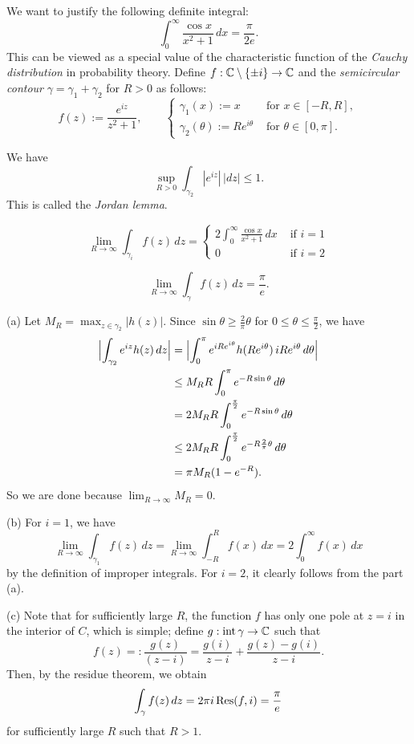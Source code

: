 \documentclass{../../large}
\begin{document}
\begin{prb}
We want to justify the following definite integral:
\[\int_0^\infty\frac{\cos x}{x^2+1}\,dx=\frac\pi{2e}.\]
This can be viewed as a special value of the characteristic function of the \emph{Cauchy distribution} in probability theory.
Define $f:\mathbb{C}\setminus\{\pm i\}\to\mathbb{C}$ and the \emph{semicircular contour} $\gamma=\gamma_1+\gamma_2$ for $R>0$ as follows:
\[f(z):=\frac{e^{iz}}{z^2+1},\qquad
\begin{cases}
\gamma_1(x):=x&\text{ for }x\in[-R,R],\\
\gamma_2(\theta):=Re^{i\theta}&\text{ for }\theta\in[0,\pi].
\end{cases}\]
\begin{parts}
\item We have
\[\sup_{R>0}\int_{\gamma_2}|e^{iz}|\,|dz|\le1.\]
This is called the \emph{Jordan lemma}.
\item
\[\lim_{R\to\infty}\int_{\gamma_i}f(z)\,dz=\begin{cases}
2\int_0^\infty\frac{\cos x}{x^2+1}\,dx&\text{ if }i=1\\
0&\text{ if }i=2
\end{cases}\]
\item
\[\lim_{R\to\infty}\int_\gamma f(z)\,dz=\frac\pi e.\]
\end{parts}
\end{prb}
\begin{pf}
(a)
Let $M_R=\max_{z\in \gamma_2}|h(z)|$.
Since $\sin\theta\ge\frac2\pi\theta$ for $0\le\theta\le\frac\pi2$, we have
\begin{align*}
\Bigl|\int_{\gamma_2}e^{iz}h(z)\,dz\Bigr|
&=\Bigl|\int_0^\pi e^{iRe^{i\theta}}h(Re^{i\theta})\,iRe^{i\theta}\,d\theta\Bigr|\\
&\le M_RR\int_0^\pi e^{-R\sin\theta}\,d\theta\\
&=2M_RR\int_0^{\frac\pi2}e^{-R\sin\theta}\,d\theta\\
&\le2M_RR\int_0^{\frac\pi2}e^{-R\frac2\pi\theta}\,d\theta\\\
&=\pi M_R(1-e^{-R}).
\end{align*}
So we are done because $\lim_{R\to\infty}M_R=0$.

(b)
For $i=1$, we have
\[\lim_{R\to\infty}\int_{\gamma_1}f(z)\,dz=\lim_{R\to\infty}\int_{-R}^Rf(x)\,dx=2\int_0^\infty f(x)\,dx\]
by the definition of improper integrals.
For $i=2$, it clearly follows from the part (a).

(c)
Note that for sufficiently large $R$, the function $f$ has only one pole at $z=i$ in the interior of $C$, which is simple; define $g:\operatorname{int}\gamma\to\mathbb{C}$ such that
\[f(z)=:\frac{g(z)}{(z-i)}=\frac{g(i)}{z-i}+\frac{g(z)-g(i)}{z-i}.\]
Then, by the residue theorem, we obtain
\[\int_\gamma f(z)\,dz=2\pi i\operatorname*{Res}(f,i)=\frac\pi e\]
for sufficiently large $R$ such that $R>1$.
\end{pf}
\end{document}
